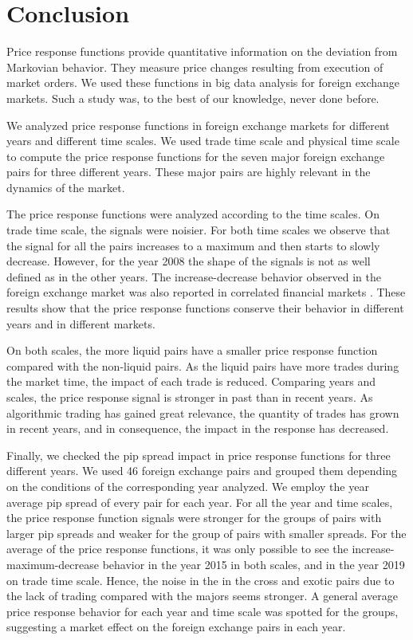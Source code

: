 \section{Conclusion}\label{sec:conclusion}

Price response functions provide quantitative information on the deviation from
Markovian behavior. They measure price changes resulting from execution of
market orders. We used these functions in big data analysis for foreign
exchange markets. Such a study was, to the best of our knowledge, never done
before.

We analyzed price response functions in foreign exchange markets for different
years and different time scales. We used trade time scale and physical time
scale to compute the price response functions for the seven major foreign
exchange pairs for three different years. These major pairs are highly relevant
in the dynamics of the market.

The price response functions were analyzed according to the time scales. On
trade time scale, the signals were noisier. For both time scales we observe
that the signal for all the pairs increases to a maximum and then starts to
slowly decrease. However, for the year 2008 the shape of the signals is not as
well defined as in the other years. The increase-decrease behavior observed in
the foreign exchange market was also reported in correlated financial markets
\cite{my_paper_response_financial,Wang_2016_avg}. These results show that the
price response functions conserve their behavior in different years and in
different markets.

On both scales, the more liquid pairs have a smaller price response function
compared with the non-liquid pairs. As the liquid pairs have more trades during
the market time, the impact of each trade is reduced. Comparing years and
scales, the price response signal is stronger in past than in recent years. As
algorithmic trading has gained great relevance, the quantity of trades has
grown in recent years, and in consequence, the impact in the response has
decreased.

Finally, we checked the pip spread impact in price response functions for three
different years. We used 46 foreign exchange pairs and grouped them depending
on the conditions of the corresponding year analyzed. We employ the year
average pip spread of every pair for each year. For all the year and time
scales, the price response function signals were stronger for the groups of
pairs with larger pip spreads and weaker for the group of pairs with smaller
spreads. For the average of the price response functions, it was only possible
to see the increase-maximum-decrease behavior in the year 2015 in both scales,
and in the year 2019 on trade time scale. Hence, the noise in the in the cross
and exotic pairs due to the lack of trading compared with the majors seems
stronger. A general average price response behavior for each year and time
scale was spotted for the groups, suggesting a market effect on the foreign
exchange pairs in each year.

